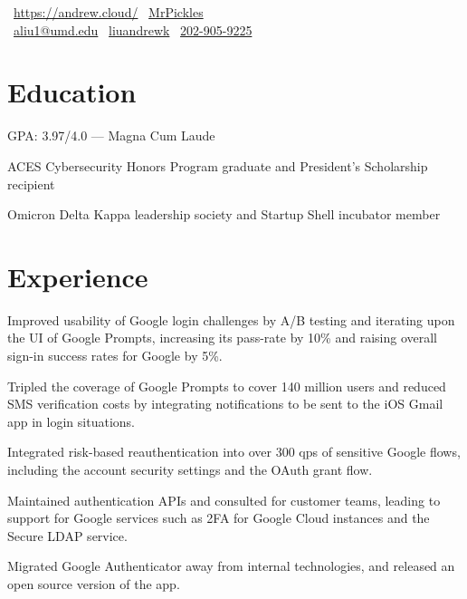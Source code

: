 \documentclass[]{template}
\begin{document}
\lastupdated

{
  \faHome \, \url{https://andrew.cloud/}
  \textcolor{white}{\textbullet} %
  \faGithub \, \href{https://github.com/MrPickles}{MrPickles}
  \\ %
  \faEnvelope \, \href{mailto:aliu1@umd.edu}{aliu1@umd.edu}
  \textcolor{white}{\textbullet} %
  \faLinkedin \, \href{https://linkedin.com/in/liuandrewk}{liuandrewk}
  \textcolor{white}{\textbullet} %
  \faPhone \, \href{tel:2029059225}{202-905-9225}
}

\section{Education}
\begin{tightemize}
\item GPA: 3.97/4.0 --- Magna Cum Laude
\item ACES Cybersecurity Honors Program graduate
      and President's Scholarship recipient
\item Omicron Delta Kappa leadership society
      and Startup Shell incubator member
\end{tightemize}
\sectionsep

\section{Experience}

\begin{tightemize}
\item
  Improved usability of Google login challenges by A/B testing and iterating
  upon the UI of Google Prompts, increasing its pass-rate by 10\% and raising
  overall sign-in success rates for Google by 5\%.
\item
  Tripled the coverage of Google Prompts to cover 140 million users and reduced
  SMS verification costs by integrating notifications to be sent to the iOS
  Gmail app in login situations.
\item
  Integrated risk-based reauthentication into over 300 qps of sensitive Google
  flows, including the account security settings and the OAuth grant flow.
\item
  Maintained authentication APIs and consulted for customer teams, leading to
  support for Google services such as 2FA for Google Cloud instances and the
  Secure LDAP service.
\item
  Migrated Google Authenticator away from internal technologies, and released an
  open source version of the app.
\end{tightemize}
\sectionsep
\end{document}
